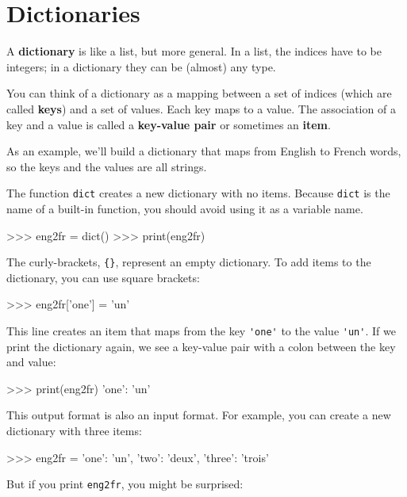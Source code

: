 \chapter{Dictionaries}


A {\bf dictionary} is like a list, but more general.  In a list,
the indices have to be integers; in a dictionary they can
be (almost) any type.

You can think of a dictionary as a mapping between a set of indices
(which are called {\bf keys}) and a set of values.  Each key maps to a
value.  The association of a key and a value is called a {\bf
  key-value pair} or sometimes an {\bf item}.

As an example, we'll build a dictionary that maps from English
to French words, so the keys and the values are all strings.

The function {\tt dict} creates a new dictionary with no items.
Because {\tt dict} is the name of a built-in function, you
should avoid using it as a variable name.


\beforeverb
\begin{pyinterpreter}
>>> eng2fr = dict()
>>> print(eng2fr)
{}
\end{pyinterpreter}
\afterverb

The curly-brackets, \verb"{}", represent an empty dictionary.
To add items to the dictionary, you can use square brackets:


\beforeverb
\begin{pyinterpreter}
>>> eng2fr['one'] = 'un'
\end{pyinterpreter}
\afterverb
%
This line creates an item that maps from the key
\verb"'one'" to the value \verb"'un'".  If we print the
dictionary again, we see a key-value pair with a colon
between the key and value:

\beforeverb
\begin{pyinterpreter}
>>> print(eng2fr)
{'one': 'un'}
\end{pyinterpreter}
\afterverb
%
This output format is also an input format.  For example,
you can create a new dictionary with three items:

\beforeverb
\begin{pyinterpreter}
>>> eng2fr = {'one': 'un', 'two': 'deux', 'three': 'trois'}
\end{pyinterpreter}
\afterverb
%
But if you print {\tt eng2fr}, you might be surprised:

